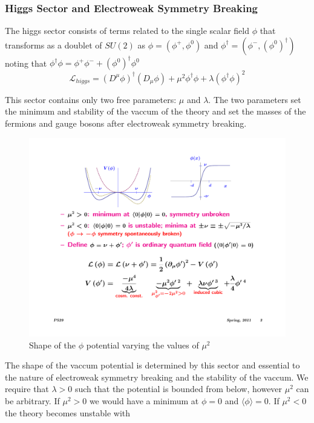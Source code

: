 \subsubsection{Higgs Sector and Electroweak Symmetry Breaking} 

The higgs sector consists of terms related to the single scalar field $\phi$ 
that transforms as a doublet of $SU(2)$ as $\phi = (\phi^+, \phi^0)$
 and $\phi^\dagger = (\phi^- , (\phi^0)^\dagger)$ noting that
 $\phi^\dagger \phi = \phi^+\phi^- + (\phi^0)^\dagger \phi^0$
\begin{equation}
\mathcal{L}_{higgs} = (D^\mu \phi)^\dagger(D_\mu \phi) + \mu^2 \phi^\dagger \phi + \lambda (\phi^\dagger \phi)^2 
\end{equation}

This sector contains only two free parameters: $\mu$ and $\lambda$. The two parameters set the minimum and stability of the vaccum of the theory and set the masses of the fermions and gauge bosons after electroweak symmetry breaking. 

\begin{figure}
\begin{center}
\includegraphics[width=.45\textwidth]{pics/scalar_potential}
\end{center}
\caption{Shape of the $\phi$ potential varying the values of $\mu^2$}
\label{fig:scalar_potential}
\end{figure}

The shape of the vaccum potential is determined by this sector and essential to the nature of electroweak symmetry
breaking and the stability of the vaccum. We require that $\lambda>0$ such that the potential is bounded from below, however $\mu^2$ can be arbitrary. If $\mu^2 >0$ we would have a minimum at $\phi=0$ and $\langle \phi \rangle =0$. If $\mu^2 < 0$ the theory becomes unstable with 

